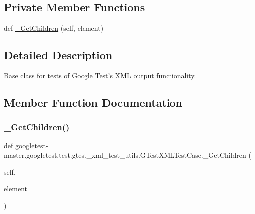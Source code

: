 \subsection*{Private Member Functions}
\begin{DoxyCompactItemize}
\item 
def \mbox{\hyperlink{classgoogletest-master_1_1googletest_1_1test_1_1gtest__xml__test__utils_1_1_g_test_x_m_l_test_case_abaf47bd77c0d64861baccc28305bda9c}{\+\_\+\+Get\+Children}} (self, element)
\end{DoxyCompactItemize}


\subsection{Detailed Description}
\begin{DoxyVerb}Base class for tests of Google Test's XML output functionality.
\end{DoxyVerb}
 

\subsection{Member Function Documentation}
\mbox{\label{classgoogletest-master_1_1googletest_1_1test_1_1gtest__xml__test__utils_1_1_g_test_x_m_l_test_case_abaf47bd77c0d64861baccc28305bda9c}} 
\subsubsection{\texorpdfstring{\_GetChildren()}{\_GetChildren()}}
{\footnotesize\ttfamily def googletest-\/master.\+googletest.\+test.\+gtest\+\_\+xml\+\_\+test\+\_\+utils.\+G\+Test\+X\+M\+L\+Test\+Case.\+\_\+\+Get\+Children (\begin{DoxyParamCaption}\item[{}]{self,  }\item[{}]{element }\end{DoxyParamCaption})\hspace{0.3cm}{\ttfamily [private]}}


